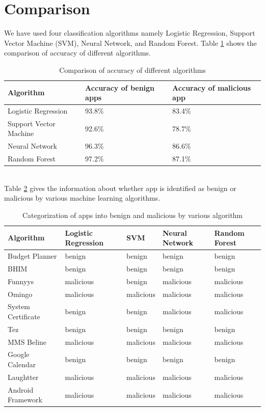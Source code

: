 \section{Comparison}
We have used four classification algorithms namely Logistic Regression, Support Vector Machine (SVM), Neural Network, and Random Forest. Table \ref{table:com1} shows the comparison of accuracy of different algorithms.
\begin{table}[h!]
    \centering
    \begin{tabular}{|p{5cm}|p{4cm}|p{4cm}|}
      \hline
      \textbf{Algorithm} & \textbf{Accuracy of benign apps} & \textbf{Accuracy of malicious app}\\
      \hline
      \hline
      Logistic Regression & 93.8\% & 83.4\%   \\ \hline
      Support Vector Machine & 92.6\% & 78.7\%  \\ \hline
      Neural Network & 96.3\% & 86.6\% \\ \hline
      Random Forest & 97.2\% & 87.1\% \\ \hline
      
    \end{tabular}%
    \caption{Comparison of accuracy of different algorithms}
    \label{table:com1}
\end{table}
\\
Table \ref{table:com2} gives the information about whether app is identified as benign or malicious by various machine learning algorithms.
\begin{table}[h!]
    \centering
    \begin{tabular}{|p{3cm}|p{3cm}|p{3cm}|p{3cm}|p{3cm}|}
      \hline
      \textbf{Algorithm} & \textbf{Logistic Regression} & \textbf{SVM} & \textbf{Neural Network} & \textbf{Random Forest}\\
      \hline
      \hline
        Budget Planner&benign & benign & benign & benign  \\ \hline
        BHIM & benign & benign & benign & benign  \\ \hline
        Funnyys & malicious & benign & malicious & malicious  \\ \hline
        Omingo & malicious & malicious & malicious & malicious  \\ \hline
        System Certificate & benign & benign & malicious & malicious  \\ \hline
        Tez & benign & benign & benign & benign  \\ \hline
        MMS Beline & malicious & malicious & malicious & malicious  \\ \hline
        Google Calendar & benign & benign & benign & benign  \\ \hline  
        Laughtter & malicious & malicious & malicious & malicious  \\ \hline
        Android Framework & malicious & malicious & malicious & malicious  \\ \hline
    \end{tabular}%
    \caption{Categorization of apps into benign and malicious by various algorithm}
    \label{table:com2}
\end{table}